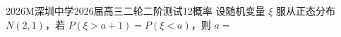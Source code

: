 
\begin{problem}{2026}{M}{深圳中学2026届高三二轮二阶测试}{12}{概率}
设随机变量 $\xi$ 服从正态分布 $N(2,1)$，若 $P(\xi>a+1)=P(\xi<a)$，则 $a=$\underline{\hspace{4em}}
\end{problem}